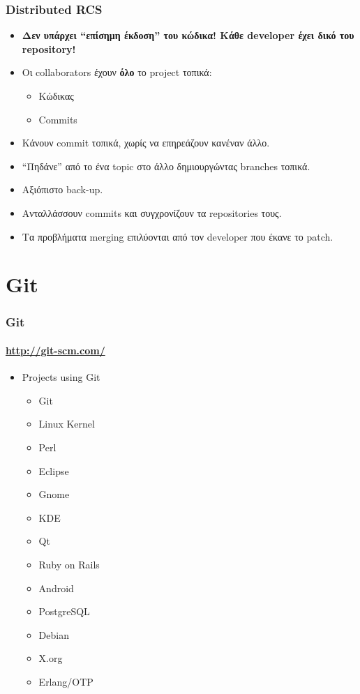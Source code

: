 \documentclass[handout]{beamer}
\begin{document}
\begin{frame}
  \frametitle{Distributed RCS}
  \begin{itemize}
    \item \textbf{Δεν υπάρχει ``επίσημη έκδοση'' του κώδικα! Κάθε developer έχει
      δικό του repository!}\pause
    \item Οι collaborators έχουν \textbf{όλο} το project τοπικά:
      \begin{itemize}
        \item Κώδικας
        \item Commits
      \end{itemize}\pause
    \item Κάνουν commit τοπικά, χωρίς να επηρεάζουν κανέναν άλλο.\pause
    \item ``Πηδάνε'' από το ένα topic στο άλλο δημιουργώντας branches
      τοπικά.\pause
    \item Αξιόπιστο back-up.\pause
    \item Ανταλλάσσουν commits και συγχρονίζουν τα repositories τους.\pause
    \item Τα προβλήματα merging επιλύονται από τον developer που έκανε το patch.
  \end{itemize}
\end{frame}

\section{Git}

\begin{frame}
  \frametitle{Git}
  \framesubtitle{\url{http://git-scm.com/}}
  \begin{itemize}
  \item Projects using Git
    \begin{itemize}
    \item Git
    \item Linux Kernel
    \item Perl
    \item Eclipse
    \item Gnome
    \item KDE
    \item Qt
    \item Ruby on Rails
    \item Android
    \item PostgreSQL
    \item Debian
    \item X.org
    \item Erlang/OTP
    \end{itemize}
  \end{itemize}
\end{frame}
\end{document}

